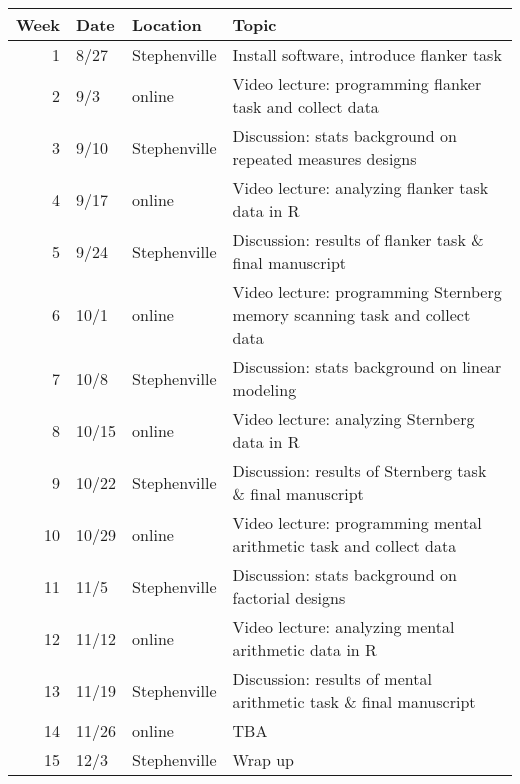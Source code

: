 \documentclass[10pt]{article}
\begin{document}
\begin{center}
\begin{tabular}{rlll}
Week & Date & Location & Topic\\
\hline
1 & 8/27 & Stephenville & Install software, introduce flanker task\\
2 & 9/3 & online & Video lecture: programming flanker task and collect data\\
3 & 9/10 & Stephenville & Discussion: stats background on repeated measures designs\\
4 & 9/17 & online & Video lecture: analyzing flanker task data in R\\
5 & 9/24 & Stephenville & Discussion: results of flanker task \& final manuscript\\
6 & 10/1 & online & Video lecture: programming Sternberg memory scanning task and collect data\\
7 & 10/8 & Stephenville & Discussion: stats background on linear modeling\\
8 & 10/15 & online & Video lecture: analyzing Sternberg data in R\\
9 & 10/22 & Stephenville & Discussion: results of Sternberg task \& final manuscript\\
10 & 10/29 & online & Video lecture: programming mental arithmetic task and collect data\\
11 & 11/5 & Stephenville & Discussion: stats background on factorial designs\\
12 & 11/12 & online & Video lecture: analyzing mental arithmetic data in R\\
13 & 11/19 & Stephenville & Discussion: results of mental arithmetic task \& final manuscript\\
14 & 11/26 & online & TBA\\
15 & 12/3 & Stephenville & Wrap up\\
\end{tabular}
\end{center}
\end{document}
